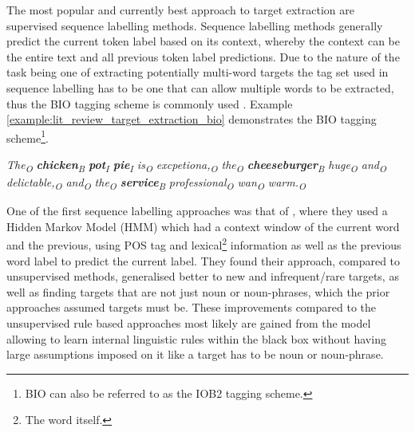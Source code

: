 The most popular and currently best approach to target extraction are supervised sequence labelling methods. Sequence labelling methods generally predict the current token label based on its context, whereby the context can be the entire text and all previous token label predictions. Due to the nature of the task being one of extracting potentially multi-word targets the tag set used in sequence labelling has to be one that can allow multiple words to be extracted, thus the BIO tagging scheme is commonly used \citep{liu-etal-2015-fine}. Example \ref{example:lit_review_target_extraction_bio} demonstrates the BIO tagging scheme\footnote{BIO can also be referred to as the IOB2 tagging scheme.}. 

\begin{example}
\textit{The\textsubscript{O} \textbf{chicken}\textsubscript{B} \textbf{pot}\textsubscript{I} \textbf{pie}\textsubscript{I} is\textsubscript{O} excpetiona,\textsubscript{O} the\textsubscript{O} \textbf{cheeseburger}\textsubscript{B} huge\textsubscript{O} and\textsubscript{O} delictable,\textsubscript{O} and\textsubscript{O} the\textsubscript{O} \textbf{service}\textsubscript{B} professional\textsubscript{O} wan\textsubscript{O} warm.\textsubscript{O}}
\caption{Target extraction example demonstrating the BIO tagging scheme, whereby all the target words are in \textbf{bold}. This was taken from the SemEval 2015 restaurant dataset \citep{pontiki-etal-2015-semeval}, sentence id 1264954:2.}
\label{example:lit_review_target_extraction_bio}
\end{example}

One of the first sequence labelling approaches was that of \citet{jin2009opinionminer}, where they used a Hidden Markov Model (HMM) which had a context window of the current word and the previous, using POS tag and lexical\footnote{The word itself.} information as well as the previous word label to predict the current label. They found their approach, compared to unsupervised methods, generalised better to new and infrequent/rare targets, as well as finding targets that are not just noun or noun-phrases, which the prior approaches assumed targets must be. These improvements compared to the unsupervised rule based approaches most likely are gained from the model allowing to learn internal linguistic rules within the black box without having large assumptions imposed on it like a target has to be noun or noun-phrase.

